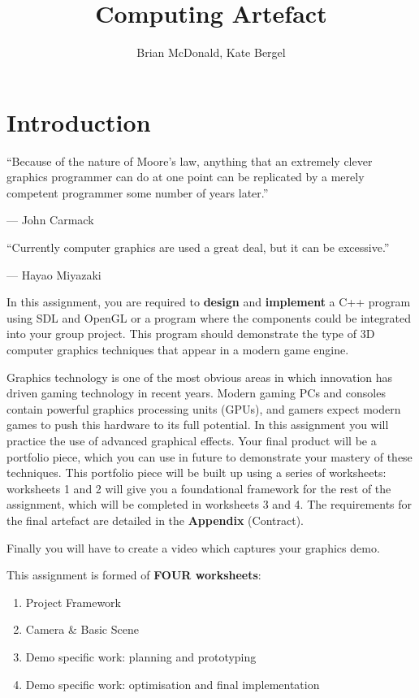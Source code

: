 \documentclass{../../fal_assignment}
\title{Computing Artefact}
\author{Brian McDonald, Kate Bergel}
\begin{document}
\maketitle

\section*{Introduction}

\begin{marginquote}
``Because of the nature of Moore's law, anything that an extremely clever graphics programmer can do at one point can be replicated by a merely competent programmer some number of years later.''

--- John Carmack

    \marginquoterule

``Currently computer graphics are used a great deal, but it can be excessive.''

--- Hayao Miyazaki
\end{marginquote}

In this assignment, you are required to \textbf{design} and \textbf{implement} a C++ program using SDL and OpenGL or a program where the components could be integrated into your group project.
This program should demonstrate the type of 3D computer graphics techniques that appear in a modern game engine.

Graphics technology is one of the most obvious areas in which innovation has driven gaming technology in recent years.
Modern gaming PCs and consoles contain powerful graphics processing units (GPUs),
and gamers expect modern games to push this hardware to its full potential.
In this assignment you will practice the use of advanced graphical effects.
Your final product will be a portfolio piece, which you can use in future to demonstrate your mastery of these techniques. This portfolio piece will be built up using a series of worksheets: worksheets 1 and 2 will give you a foundational framework for the rest of the assignment, which will be completed in worksheets 3 and 4. The requirements for the final artefact are detailed in the \textbf{Appendix} (Contract).

Finally you will have to create a video which captures your graphics demo.

This assignment is formed of \textbf{FOUR worksheets}:
\begin{enumerate}[label=\arabic*)]
	\item Project Framework
	\item Camera \& Basic Scene
	\item Demo specific work: planning and prototyping
	\item Demo specific work: optimisation and final implementation
\end{enumerate}
\end{document}
